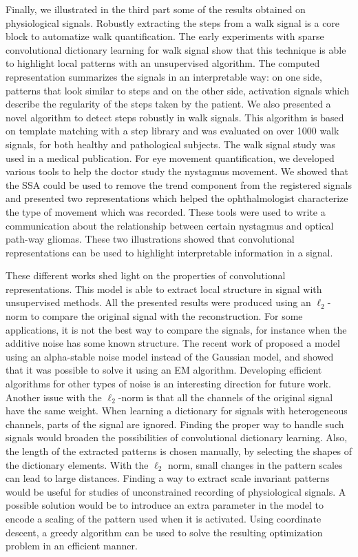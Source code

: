 \documentclass[../thesis.tex]{subfiles}
\begin{document}
	Finally, we illustrated in the third part some of the results obtained on physiological
	signals. Robustly extracting the steps from a walk signal is a core block to automatize
	walk quantification. The early experiments with sparse convolutional dictionary
	learning for walk signal show that this technique is able to highlight local patterns
	with an unsupervised algorithm. The computed representation
	summarizes the signals in an interpretable way: on one side, patterns that look similar
	to steps and on the other side, activation signals which describe the regularity of the
	steps taken by the patient. We also presented a novel algorithm to detect steps robustly
	in walk signals. This algorithm is based on template matching with a step library and
	was evaluated on over 1000 walk signals, for both healthy and pathological subjects.
	The walk signal study was used in a medical publication. For eye movement quantification,
	we developed various tools to help the doctor study the nystagmus movement. We showed that
	the SSA could be used to remove the trend component from the registered signals and
	presented two representations which helped the ophthalmologist characterize the type
	of movement which was recorded. These tools were used to write a communication about
	the relationship between certain nystagmus and optical path-way gliomas. These two
	illustrations showed that convolutional representations can be used to highlight
	interpretable information in a signal.


	These different works shed light on the properties of convolutional representations.
	This model is able to extract local structure in signal with unsupervised methods.
	All the presented results were produced using an $\ell_2$-norm to compare the original
	signal with the reconstruction. For some applications, it is not the best way to compare
	the signals, for instance when the additive noise has some known structure. The recent
	work of \citet{Gramfort2017} proposed a model using an alpha-stable noise model instead
	of the Gaussian model, and showed that it was possible to solve it using an EM algorithm.
	Developing efficient algorithms for other types of noise is an interesting direction for
	future work. Another issue with the $\ell_2$-norm is that all the channels of the original
	signal have the same weight. When learning a dictionary for signals with heterogeneous
	channels, parts of the signal are ignored. Finding the proper
	way to handle such signals would broaden the possibilities of convolutional dictionary
	learning. Also, the length of the extracted patterns is chosen manually, by selecting
	the shapes of the dictionary elements. With the $\ell_2$ norm, small changes in the pattern
	scales can lead to large distances. Finding a way to extract scale invariant patterns
	would be useful for studies of unconstrained recording of physiological signals. A
	possible solution would be to introduce an extra parameter in the model to encode
	a scaling of the pattern used when it is activated. Using coordinate descent, a
	greedy algorithm can be used to solve the resulting optimization problem in an
	efficient manner.



\biblio{}
\end{document}
